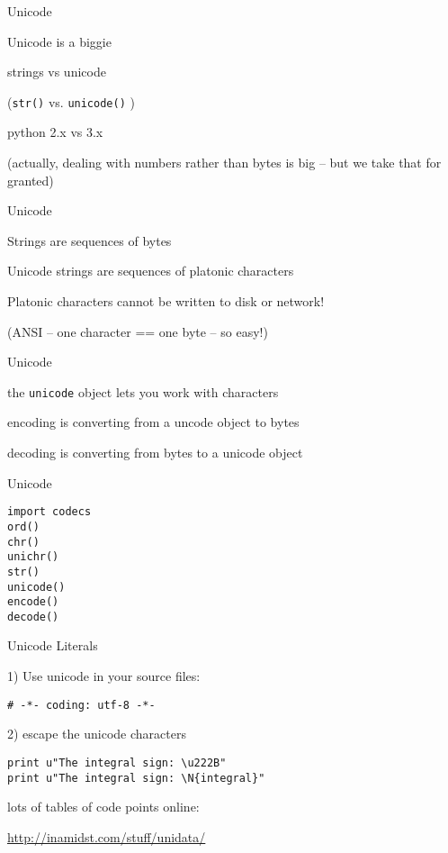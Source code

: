 \documentclass{beamer}
\begin{document}
\begin{frame}[fragile]{Unicode}

{\Large
\vfill

Unicode is a biggie

\vfill
strings vs unicode 
}

{\large (\verb|str()| vs. \verb|unicode()| ) }

\vfill
{\Large python 2.x vs 3.x}


\vfill
(actually, dealing with numbers rather than bytes is big -- but we take that for granted)

\end{frame}

\begin{frame}[fragile]{Unicode}

{\Large
\vfill
Strings are sequences of bytes

\vfill
Unicode strings are sequences of platonic characters

\vfill
Platonic characters cannot be written to disk or network!
}
\vfill
(ANSI -- one character == one byte -- so easy!)
\end{frame}

\begin{frame}[fragile]{Unicode}

{\Large
\vfill
the \verb|unicode| object lets you work with characters

\vfill
encoding is converting from a uncode object to bytes

\vfill
decoding is converting from bytes to a unicode object

}
\vfill
\end{frame}

\begin{frame}[fragile]{Unicode}

\begin{verbatim}
import codecs
ord()
chr()
unichr()
str()
unicode()
encode()
decode()
\end{verbatim}
\end{frame}

\begin{frame}[fragile]{Unicode Literals}


{\Large 1) Use unicode in your source files:}

\begin{verbatim}
# -*- coding: utf-8 -*-
\end{verbatim}

\vfill
{\Large 2) escape the unicode characters}

\begin{verbatim}
print u"The integral sign: \u222B"
print u"The integral sign: \N{integral}"
\end{verbatim}

{\large lots of tables of code points online:}

\url{http://inamidst.com/stuff/unidata/}

\end{frame}
\end{document}
